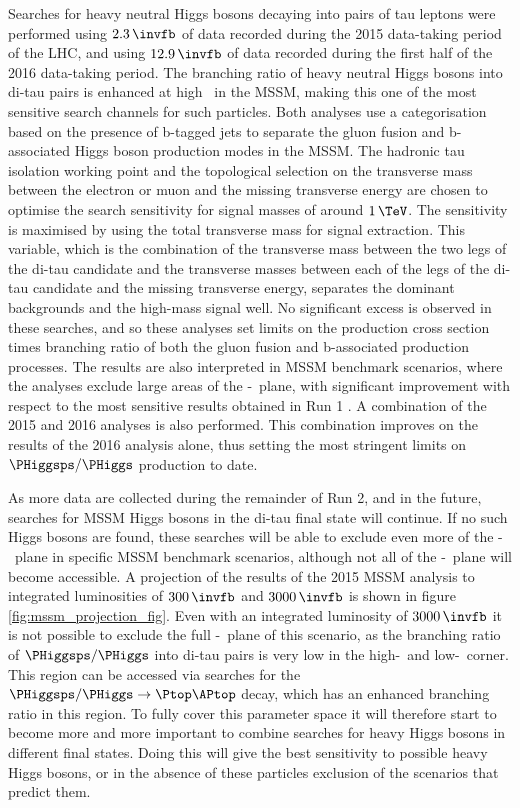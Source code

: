 Searches for heavy neutral Higgs bosons decaying into pairs of tau leptons were performed
using $2.3\,\invfb$ of data recorded during the 2015
data-taking period of the \ac{LHC}, and using $12.9\,\invfb$ of 
data recorded during the first half of the 2016 data-taking period. The 
branching ratio of heavy neutral Higgs bosons into di-tau pairs is enhanced at high \tanb~in the \ac{MSSM},
making this one of the most sensitive search channels for such particles. Both analyses use a categorisation 
based on the presence of b-tagged jets to separate
the gluon fusion and b-associated Higgs boson production modes in the \ac{MSSM}. 
The hadronic tau isolation working point and the topological selection on 
the transverse mass between the electron or muon and the missing transverse energy are chosen to optimise the search sensitivity for signal
masses of around $1\,\TeV$.
The sensitivity is maximised by using the total transverse mass for signal extraction. This variable, which is 
the combination of the transverse
mass between the two legs of the di-tau candidate and the transverse masses between each of the legs
of the di-tau candidate and the missing transverse energy,
separates the dominant backgrounds
and the high-mass signal well.
No significant excess is observed in these searches, and so 
these analyses set limits on the production cross section times branching ratio of both the
gluon fusion and b-associated production processes. The results are also
interpreted in \ac{MSSM} benchmark scenarios, where the analyses exclude large areas
of the \mA-\tanb~plane, with significant improvement with respect to the most sensitive
results obtained in Run 1 \cite{CMS-PAS-HIG-16-006,CMS-PAS-HIG-16-037}. A combination of the 2015 and 2016 analyses is also
performed. This combination improves on the results of the 2016 analysis alone, thus
setting the most stringent limits on $\PHiggsps/\PHiggs$ production to date.

As more data are collected during the remainder of Run 2, and in the 
future, searches for \ac{MSSM} Higgs bosons in the di-tau final
state will continue. If no such Higgs bosons are found, these searches
will be able to exclude even more of the \mA-\tanb~plane in specific
\ac{MSSM} benchmark scenarios, although not all of the \mA-\tanb~plane
will become accessible. A projection of the results of the 2015 \ac{MSSM}
analysis to integrated luminosities of $300\,\invfb$ and $3000\,\invfb$ \cite{HTT-projection} is
shown in figure \ref{fig:mssm_projection_fig}. Even with an integrated luminosity of
$3000\,\invfb$ it is not possible to exclude the full \mA-\tanb~plane of this scenario,
as the branching ratio of $\PHiggsps/\PHiggs$ into di-tau pairs 
is very low in the high-\mA~and low-\tanb~corner. This region can be accessed 
via searches for the $\PHiggsps/\PHiggs \rightarrow \Ptop\APtop$ decay, which
has an enhanced branching ratio in this region. To fully cover this
parameter space it will therefore start to become more and more
important to combine searches for heavy Higgs bosons in different final states.
Doing this will give the best sensitivity to possible
heavy Higgs bosons, or in the absence of these particles exclusion
of the scenarios that predict them.


